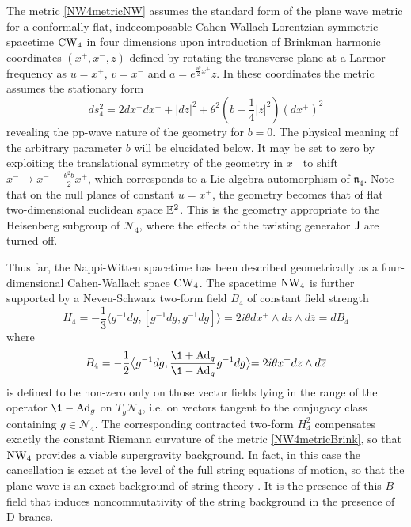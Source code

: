 The metric \eqref{NW4metricNW} assumes the standard form of the plane wave
metric for a conformally flat, indecomposable Cahen-Wallach Lorentzian symmetric
spacetime $\operatorname{CW}_4$ in four dimensions \cite{CW1} upon introduction of Brinkman
harmonic coordinates $(x^+,x^-,z)$ \cite{Brink1} defined by rotating the
transverse plane at a Larmor frequency as $u=x^+$, $v=x^-$ and $a=e^{\frac{ i
    \theta}2 x^+} z$. In these coordinates the metric assumes the stationary form
\begin{equation}
  \label{NW4metricBrink}
  d s_4^2=2  d x^+  d x^-+| d z|^2+\theta^2 
  \left(b-\frac14 |z|^2\right) 
  \left( d x^+\right)^2
\end{equation}
revealing the pp-wave nature of the geometry for $b=0$. The physical meaning of
the arbitrary parameter $b$ will be elucidated below. It may be set to zero by
exploiting the translational symmetry of the geometry in $x^-$ to shift $x^-\to
x^--\frac{\theta^2 b}2 x^+$, which corresponds to a Lie algebra automorphism of
$\mathfrak n_4$. Note that on the null planes of constant $u=x^+$, the geometry
becomes that of flat two-dimensional euclidean space ${\mathbb E}^2$. This is the
geometry appropriate to the Heisenberg subgroup of $\mathcal{N}_4$, where the
effects of the twisting generator ${\sf J}$ are turned off.

Thus far, the Nappi-Witten spacetime has been described geometrically as a
four-dimensional Cahen-Wallach space $\operatorname{CW}_4$. The spacetime $\operatorname{NW}_4$ is further
supported by a Neveu-Schwarz two-form field $B_4$ of constant field strength
\begin{equation}
  \label{NS3formBrink}
  H_4=-\frac13 \bigl\langle g^{-1}  d g , 
  \left[g^{-1}  d g , g^{-1}  d g\right]\bigl\rangle
   = 2 i \theta  d x^+\wedge d z\wedge d\overline{z} =  d B_4
\end{equation}
where
\begin{equation}
  \label{NS2formBrink}
  B_4=-\frac12 \bigl\langle g^{-1}  d g , 
  \frac{\1+{\rm Ad}_g}{\1-{\rm Ad}_g} g^{-1}  d g\bigl\rangle = 
  2 i \theta x^+  d z\wedge d\overline{z}
\end{equation}
is defined to be non-zero only on those vector fields lying in the range of the
operator $\1-{\rm Ad}_g$ on $T_g\mathcal{N}_4$, i.e. on vectors tangent to the
conjugacy class containing $g\in\mathcal{N}_4$. The corresponding contracted
two-form $H_4^2$ compensates exactly the constant Riemann curvature of the
metric \eqref{NW4metricBrink}, so that $\operatorname{NW}_4$ provides a viable supergravity
background. In fact, in this case the cancellation is exact at the level of the
full string equations of motion, so that the plane wave is an exact background
of string theory \cite{NW1}. It is the presence of this $B$-field that induces
noncommutativity of the string background in the presence of D-branes.

